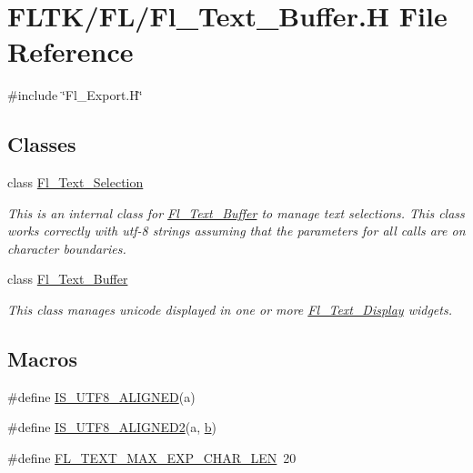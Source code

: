 \hypertarget{_fl___text___buffer_8_h}{}\section{F\+L\+T\+K/\+F\+L/\+Fl\+\_\+\+Text\+\_\+\+Buffer.H File Reference}
\label{_fl___text___buffer_8_h}
{\ttfamily \#include \char`\"{}Fl\+\_\+\+Export.\+H\char`\"{}}\newline
\subsection*{Classes}
\begin{DoxyCompactItemize}
\item 
class \hyperlink{class_fl___text___selection}{Fl\+\_\+\+Text\+\_\+\+Selection}
\begin{DoxyCompactList}\small\item\em This is an internal class for \hyperlink{class_fl___text___buffer}{Fl\+\_\+\+Text\+\_\+\+Buffer} to manage text selections. This class works correctly with utf-\/8 strings assuming that the parameters for all calls are on character boundaries. \end{DoxyCompactList}\item 
class \hyperlink{class_fl___text___buffer}{Fl\+\_\+\+Text\+\_\+\+Buffer}
\begin{DoxyCompactList}\small\item\em This class manages unicode displayed in one or more \hyperlink{class_fl___text___display}{Fl\+\_\+\+Text\+\_\+\+Display} widgets. \end{DoxyCompactList}\end{DoxyCompactItemize}
\subsection*{Macros}
\begin{DoxyCompactItemize}
\item 
\#define \hyperlink{_fl___text___buffer_8_h_acae0ad63ad39752e4e636f2377d5b71d}{I\+S\+\_\+\+U\+T\+F8\+\_\+\+A\+L\+I\+G\+N\+ED}(a)
\item 
\#define \hyperlink{_fl___text___buffer_8_h_abb7018b201a55f41f1f392c784613904}{I\+S\+\_\+\+U\+T\+F8\+\_\+\+A\+L\+I\+G\+N\+E\+D2}(a,  \hyperlink{forms_8_h_a0ba06a290a384fa06b1b90745827dae2}{b})
\item 
\#define \hyperlink{_fl___text___buffer_8_h_aca48bba5d04e6174920efb35b079d107}{F\+L\+\_\+\+T\+E\+X\+T\+\_\+\+M\+A\+X\+\_\+\+E\+X\+P\+\_\+\+C\+H\+A\+R\+\_\+\+L\+EN}~20
\end{DoxyCompactItemize}
